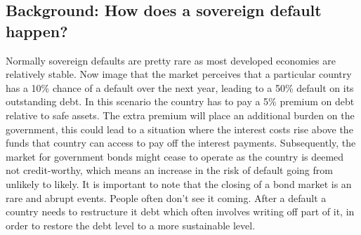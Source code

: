 \documentclass{tufte-handout}
\begin{document}
\subsection{Background: How does a sovereign default happen?}
Normally sovereign defaults are pretty rare as most developed economies are relatively stable. 
Now image that the market perceives that a particular country has a 10\% chance of a default over the next year, leading to a 50\% default on its outstanding debt. 
In this scenario the country has to pay a 5\% premium on debt relative to safe assets. 
The extra premium will place an additional burden on the government, this could lead to a situation where the interest costs rise above the funds that country can access to pay off the interest payments. 
Subsequently, the market for government bonds might cease to operate as the country is deemed not credit-worthy, which means an increase in the risk of default going from unlikely to likely. 
It is important to note that the closing of a bond market is an rare and abrupt events. 
People often don't see it coming. 
After a default a country needs to restructure it debt which often involves writing off part of it, in order to restore the debt level to a more sustainable level.



\end{document}
